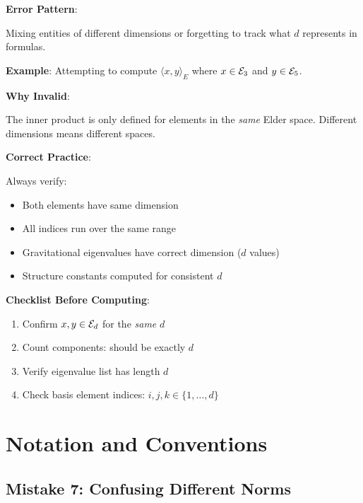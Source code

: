\begin{warning}
\textbf{Error Pattern}:

Mixing entities of different dimensions or forgetting to track what $d$ represents in formulas.

\textbf{Example}: Attempting to compute $\langle x, y \rangle_E$ where $x \in \mathcal{E}_{3}$ and $y \in \mathcal{E}_{5}$.

\textbf{Why Invalid}:

The inner product is only defined for elements in the \textit{same} Elder space. Different dimensions means different spaces.

\textbf{Correct Practice}:

Always verify:
\begin{itemize}
\item Both elements have same dimension
\item All indices run over the same range
\item Gravitational eigenvalues have correct dimension ($d$ values)
\item Structure constants computed for consistent $d$
\end{itemize}

\textbf{Checklist Before Computing}:
\begin{enumerate}
\item Confirm $x, y \in \mathcal{E}_{d}$ for the \textit{same} $d$
\item Count components: should be exactly $d$
\item Verify eigenvalue list has length $d$
\item Check basis element indices: $i, j, k \in \{1, \ldots, d\}$
\end{enumerate}
\end{warning}

\section{Notation and Conventions}

\subsection{Mistake 7: Confusing Different Norms}

